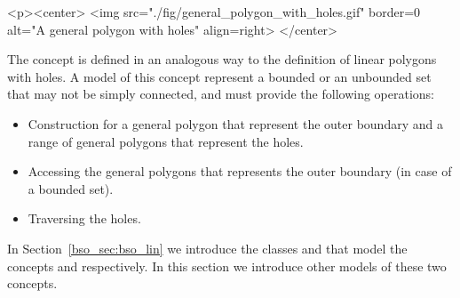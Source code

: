 \lcTex{%
  \setlength{\BooleanSetOpsWidthRight}{1.4cm}
  \setlength{\BooleanSetOpsWidthLeft}{\BooleanSetOpsWidthLineReal}
  \addtolength{\BooleanSetOpsWidthLeft}{-\BooleanSetOpsWidthRight}
  \begin{minipage}{\BooleanSetOpsWidthLeft}
}
\label{fig:general_polygon_with_holes}
\begin{ccHtmlOnly}
  <p><center>
    <img src="./fig/general_polygon_with_holes.gif" border=0 alt="A general polygon with holes" align=right>
  </center>
\end{ccHtmlOnly}
The concept  is defined in an analogous
way to the definition of linear polygons with holes. A model of this
concept represent a bounded or an unbounded set that may not be simply
connected, and must provide the following operations:
\begin{itemize}
\item Construction for a general polygon that represent the outer boundary
and a range of general polygons that represent the holes.
\item Accessing the general polygons that represents the outer boundary
(in case of a bounded set).
\item Traversing the holes.
\end{itemize}
In Section~\ref{bso_sec:bso_lin} we introduce the classes
 and  that model the concepts
 and 
respectively. In this section we introduce other models of these two
concepts.


